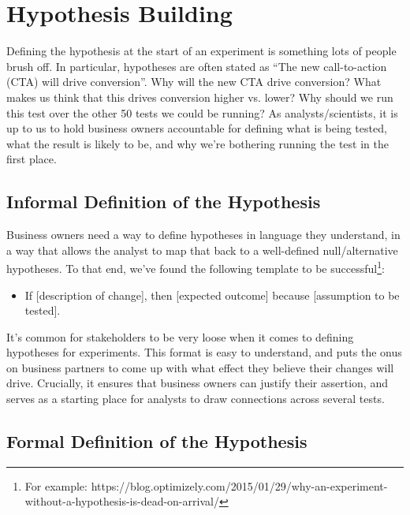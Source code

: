 \documentclass{article}
\numberwithin{equation}{section}
\begin{document}
\section{Hypothesis Building}

Defining the hypothesis at the start of an experiment is something lots of people brush off. In particular, hypotheses are often stated as ``The new call-to-action (CTA) will drive conversion''. Why will the new CTA drive conversion? What makes us think that this drives conversion higher vs. lower? Why should we run this test over the other 50 tests we could be running? As analysts/scientists, it is up to us to hold business owners accountable for defining what is being tested, what the result is likely to be, and why we're bothering running the test in the first place. 

\subsection{Informal Definition of the Hypothesis}

Business owners need a way to define hypotheses in language they understand, in a way that allows the analyst to map that back to a well-defined null/alternative hypotheses. To that end, we've found the following template to be successful\footnote{For example: https://blog.optimizely.com/2015/01/29/why-an-experiment-without-a-hypothesis-is-dead-on-arrival/}:
\begin{itemize}
	\item If [description of change], then [expected outcome] because [assumption to be tested].
\end{itemize}
It's common for stakeholders to be very loose when it comes to defining hypotheses for experiments. This format is easy to understand, and puts the onus on business partners to come up with what effect they believe their changes will drive. Crucially, it ensures that business owners can justify their assertion, and serves as a starting place for analysts to draw connections across several tests.

\subsection{Formal Definition of the Hypothesis \label{sec_hypothesis}}
\end{document}
